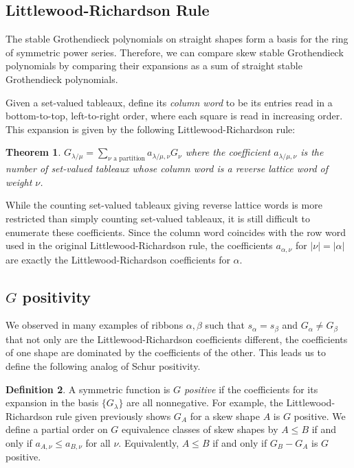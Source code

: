 \documentclass[12pt]{amsart}
\newtheorem{thm}{Theorem}[section]
\theoremstyle{definition}
\newtheorem{defn}[thm]{Definition}
\begin{document}
\iffalse
\subsection{Littlewood-Richardson Rule}

The stable Grothendieck polynomials on straight shapes form a basis for the ring of symmetric power series. Therefore, we can compare skew stable Grothendieck polynomials by comparing their expansions as a sum of straight stable Grothendieck polynomials.

Given a set-valued tableaux, define its \textit{column word} to be its entries read in a bottom-to-top, left-to-right order, where each square is read in increasing order. This expansion is given by the following Littlewood-Richardson rule:

\begin{thm} \cite{buch2002lrrule}
$G_{\lambda/\mu} = \sum_{\nu \text{ a partition}} a_{\lambda/\mu, \nu} G_\nu$ where the coefficient $a_{\lambda/\mu, \nu}$ is the number of set-valued tableaux whose column word is a reverse lattice word of weight $\nu$. 
\end{thm}

While the counting set-valued tableaux giving reverse lattice words is more restricted than simply counting set-valued tableaux, it is still difficult to enumerate these coefficients. Since the column word coincides with the row word used in the original Littlewood-Richardson rule, the coefficients $a_{\alpha, \nu}$ for $|\nu| = |\alpha|$ are exactly the Littlewood-Richardson coefficients for $\alpha$. 

\subsection{$G$ positivity}
We observed in many examples of ribbons $\alpha, \beta$ such that $s_\alpha = s_\beta$ and $G_\alpha \neq G_\beta$ that not only are the Littlewood-Richardson coefficients different, the coefficients of one shape are dominated by the coefficients of the other. This leads us to define the following analog of Schur positivity.

\begin{defn}
A symmetric function is \textit{$G$ positive} if the coefficients for its expansion in the basis $\{G_\lambda\}$ are all nonnegative. For example, the Littlewood-Richardson rule given previously shows $G_A$ for a skew shape $A$ is $G$ positive. We define a partial order on $G$ equivalence classes of skew shapes by $A\leq B$ if and only if $a_{A,\nu} \leq a_{B,\nu}$ for all $\nu$. Equivalently, $A \leq B$ if and only if $G_B - G_A$ is $G$ positive.
\end{defn}
\end{document}
